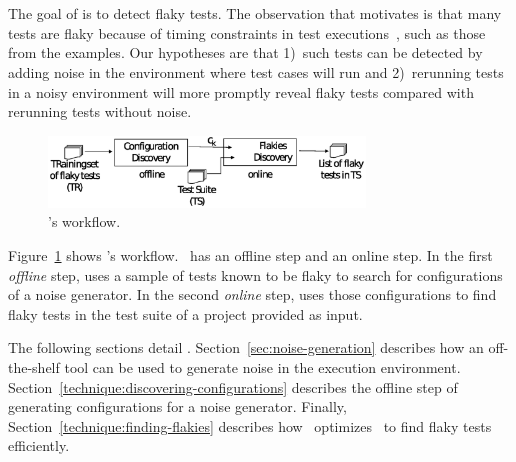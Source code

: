 \documentclass[conference]{IEEEtran}
\begin{document}

\section{\tname{}}
\label{sec:approach}


\sloppy
The goal of \tname{} is to detect flaky tests. The observation that motivates \tname{} is that many tests are flaky because of timing constraints in test executions~\cite{Luo:2014:EAF:2635868.2635920,thorve2018empirical,dong2020concurrencyrelated}, such as those from the examples. Our hypotheses are that 1)~such tests can be detected by adding noise in the environment where test cases will run and 2)~rerunning tests in a noisy environment will more promptly reveal flaky tests compared with rerunning tests without noise.

\begin{figure}[h]
    \centering
    \includegraphics[trim=0 400 0 0,clip,width=0.75\textwidth]{figs/shaker.eps}
    \caption{\tname's workflow.}
    \label{fig:workflow}
\end{figure}

Figure~\ref{fig:workflow} shows \tname{}'s workflow. \tname\ has an offline step and an online step. In the first \emph{offline} step, \tname{} uses a sample of tests known to be flaky to search for configurations of a noise generator. In the second \emph{online} step, \tname{} uses those configurations to find flaky tests in the test suite of a project provided as input. 

The following sections detail \tname. Section~\ref{sec:noise-generation} describes how an off-the-shelf tool can be used to generate noise in the execution environment. Section~\ref{technique:discovering-configurations} describes the offline step of generating configurations for a noise generator. Finally, Section~\ref{technique:finding-flakies} describes how \tname\ optimizes \rerun\ to find flaky tests efficiently.

\end{document}

